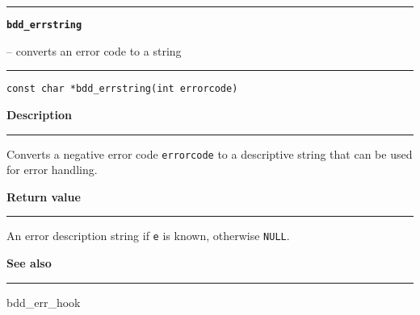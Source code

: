 \vspace{8ex}
\begin{minipage}{\textwidth}

\noindent\begin{minipage}{\textwidth}
\rule{\textwidth}{0.5mm}
{\tt\bf bdd\_errstring }
\--- converts an error code to a string \hspace{\fill}
\\\rule[1.5ex]{\textwidth}{0.5mm}
\end{minipage}

\noindent\begin{verbatim}
const char *bdd_errstring(int errorcode) 
\end{verbatim}

\vspace{\parsep}\noindent
{\bf Description}\\\rule[1.5ex]{\textwidth}{0.2mm}\vspace{-1.5ex}\setlength{\parindent}{1em}
Converts a negative error code {\tt errorcode} to a descriptive
           string that can be used for error handling. 

\setlength{\parindent}{0em}\vspace{\parsep}\vspace{\baselineskip}\noindent
{\bf Return value}\\\rule[1.5ex]{\textwidth}{0.2mm}\vspace{-1.5ex}
An error description string if {\tt e} is known, otherwise {\tt NULL}. 

\vspace{\parsep}\vspace{\baselineskip}\noindent
{\bf See also}\\\rule[1.5ex]{\textwidth}{0.2mm}\vspace{-1.5ex}
bdd\_err\_hook 
\end{minipage}
\vspace{8ex}
